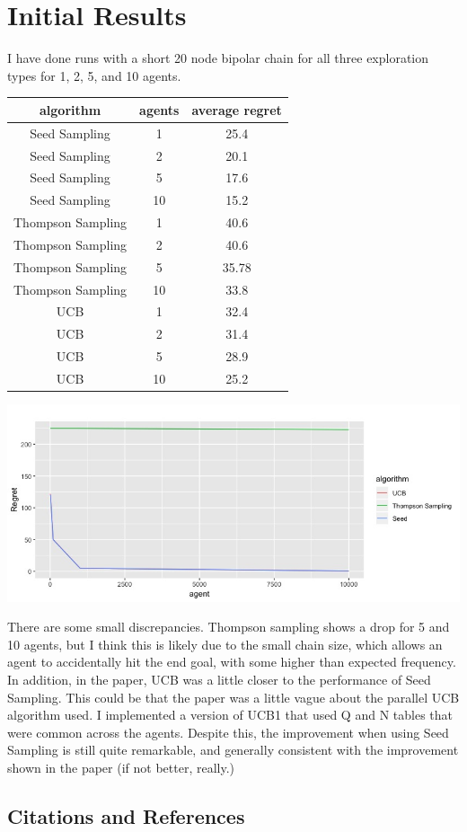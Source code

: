 \documentclass{article}
\begin{document}
    
\section{Initial Results}
I have done runs with a short 20 node bipolar chain for all three exploration types for 1, 2, 5, and 10 agents.
\begin{tabular}{|c|c|c|}
\hline 
algorithm & agents & average regret \\ 
\hline 
Seed Sampling & 1 & 25.4 \\ 
\hline 
Seed Sampling&2&20.1 \\ 
\hline 
Seed Sampling&5&17.6 \\ 
\hline 
Seed Sampling&10&15.2 \\ 
\hline 
Thompson Sampling&1&40.6 \\ 
\hline 
Thompson Sampling&2&40.6  \\ 
\hline 
Thompson Sampling&5&35.78 \\ 
\hline 
Thompson Sampling&10&33.8  \\ 
\hline 
UCB&1&32.4  \\ 
\hline 
UCB&2&31.4 \\ 
\hline 
UCB&5&28.9 \\ 
\hline 
UCB&10&25.2 \\ 
\hline 
\end{tabular} 

\includegraphics[scale=.6]{results_pre.jpeg}

There are some small discrepancies. Thompson sampling shows a drop for 5 and 10 agents, but I think this is likely due to the small chain size, which allows an agent to accidentally hit the end goal, with some higher than expected frequency. In addition, in the paper, UCB was a little closer to the performance of Seed Sampling. This could be that the paper was a little vague about the parallel UCB algorithm used. I implemented a version of UCB1 that used Q and N tables that were common across the agents. Despite this, the improvement when using Seed Sampling is still quite remarkable, and generally consistent with the improvement shown in the paper (if not better, really.)

\subsection{Citations and References}



\end{document}
